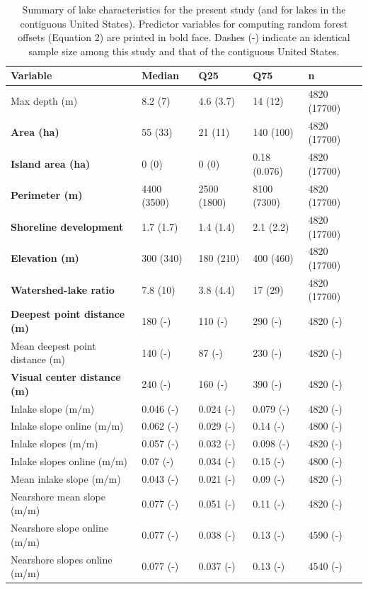 \documentclass[draft,wrr]{agutexSI2019}
\begin{document}
\begin{table}
\caption{Summary of lake characteristics for the present study (and for lakes in the contiguous United States). Predictor variables for computing random forest offsets (Equation 2) are printed in bold face. Dashes (-) indicate an identical sample size among this study and that of the contiguous United States.} \label{tableS1}
\centering
\setlength\tabcolsep{1.5pt} %
\begin{tabular}{lllll}
\hline
Variable & Median & Q25 & Q75 & n\\
\hline
Max depth (m) & 8.2 (7) & 4.6 (3.7) & 14 (12) & 4820 (17700)\\
\textbf{Area (ha)} & 55 (33) & 21 (11) & 140 (100) & 4820 (17700)\\
\textbf{Island area (ha)} & 0 (0) & 0 (0) & 0.18 (0.076) & 4820 (17700)\\
\textbf{Perimeter (m)} & 4400 (3500) & 2500 (1800) & 8100 (7300) & 4820 (17700)\\
\textbf{Shoreline development} & 1.7 (1.7) & 1.4 (1.4) & 2.1 (2.2) & 4820 (17700)\\
\textbf{Elevation (m)} & 300 (340) & 180 (210) & 400 (460) & 4820 (17700)\\
\textbf{Watershed-lake ratio} & 7.8 (10) & 3.8 (4.4) & 17 (29) & 4820 (17700)\\
\textbf{Deepest point distance (m)} & 180 (-) & 110 (-) & 290 (-) & 4820 (-)\\
Mean deepest point distance (m) & 140 (-) & 87 (-) & 230 (-) & 4820 (-)\\
\textbf{Visual center distance (m)} & 240 (-) & 160 (-) & 390 (-) & 4820 (-)\\
Inlake slope (m/m) & 0.046 (-) & 0.024 (-) & 0.079 (-) & 4820 (-)\\
Inlake slope online (m/m) & 0.062 (-) & 0.029 (-) & 0.14 (-) & 4800 (-)\\
Inlake slopes (m/m) & 0.057 (-) & 0.032 (-) & 0.098 (-) & 4820 (-)\\
Inlake slopes online (m/m) & 0.07 (-) & 0.034 (-) & 0.15 (-) & 4800 (-)\\
Mean inlake slope (m/m) & 0.043 (-) & 0.021 (-) & 0.09 (-) & 4820 (-)\\
Nearshore mean slope (m/m) & 0.077 (-) & 0.051 (-) & 0.11 (-) & 4820 (-)\\
Nearshore slope online (m/m) & 0.077 (-) & 0.038 (-) & 0.13 (-) & 4590 (-)\\
Nearshore slopes online (m/m) & 0.077 (-) & 0.037 (-) & 0.13 (-) & 4540 (-)\\
\hline
\end{tabular}
\end{table}
\end{document}
